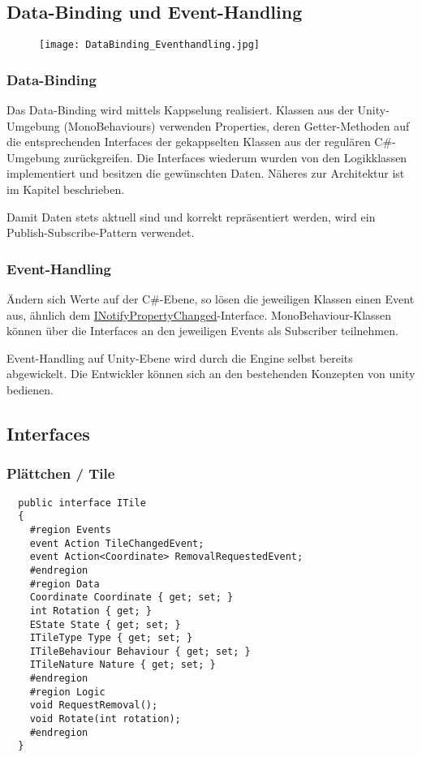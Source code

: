 \documentclass[../main.tex]{subfiles}
\begin{document}
	\subsection{Data-Binding und Event-Handling}
	\begin{figure}[H]
		\centering
		\texttt{[image: DataBinding\_Eventhandling.jpg]}
	\end{figure}
	\subsubsection{Data-Binding}
	\par Das Data-Binding wird mittels Kappselung realisiert. Klassen aus der Unity-Umgebung (MonoBehaviours) verwenden Properties, deren Getter-Methoden auf die entsprechenden Interfaces der gekappselten Klassen aus der regulären C\#-Umgebung zurückgreifen. Die Interfaces wiederum wurden von den Logikklassen implementiert und besitzen die gewünschten Daten. Näheres zur Architektur ist im Kapitel  beschrieben.
	\par Damit Daten stets aktuell sind und korrekt repräsentiert werden, wird ein Publish-Subscribe-Pattern verwendet.
	
	\subsubsection{Event-Handling}
	\par Ändern sich Werte auf der C\#-Ebene, so lösen die jeweiligen Klassen einen Event aus, ähnlich dem \href{https://docs.microsoft.com/en-us/dotnet/api/system.componentmodel.inotifypropertychanged?view=net-5.0}{INotifyPropertyChanged}-Interface. MonoBehaviour-Klassen können über die Interfaces an den jeweiligen Events als Subscriber teilnehmen.
	\par Event-Handling auf Unity-Ebene wird durch die Engine selbst bereits abgewickelt. Die Entwickler können sich an den bestehenden Konzepten von \gls{unity} bedienen.
	
	\subsection{Interfaces}
	\subsubsection{Plättchen / Tile}
	\begin{lstlisting}
  public interface ITile
  {
	#region Events
	event Action TileChangedEvent;
	event Action<Coordinate> RemovalRequestedEvent;
	#endregion
	#region Data
	Coordinate Coordinate { get; set; }
	int Rotation { get; }
	EState State { get; set; }
	ITileType Type { get; set; }
	ITileBehaviour Behaviour { get; set; }
	ITileNature Nature { get; set; }
	#endregion
	#region Logic
	void RequestRemoval();
	void Rotate(int rotation);
	#endregion
  }
	\end{lstlisting}
\end{document}
